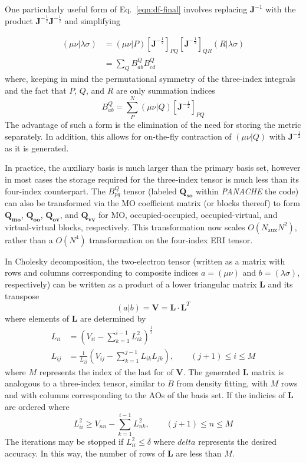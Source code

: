\documentclass[12pt,letterpaper]{article}
\newcommand{\transpose}{T}
\newcommand{\mat}[1]{\ensuremath{\bm{#1}}\xspace}
\newcommand{\ten}[1]{\ensuremath{\bm{#1}}\xspace}
\newcommand{\panache}{\textit{PANACHE}\xspace}
\newcommand{\Qso}{\ten{Q_{so}}}
\newcommand{\Qmo}{\ten{Q_{mo}}}
\newcommand{\Qoo}{\ten{Q_{oo}}}
\newcommand{\Qov}{\ten{Q_{ov}}}
\newcommand{\Qvv}{\ten{Q_{vv}}}
\begin{document}
One particularly useful form of Eq.~\ref{eqn:df-final}
involves replacing $\mat{J}^{-1}$ with the product
$\mat{J}^{-\frac{1}{2}}\mat{J}^{-\frac{1}{2}}$ and simplifying

\begin{align}
( \mu\nu | \lambda\sigma ) &= (\mu\nu | P) [\mat{J}^{-\frac{1}{2}}]_{PQ} [\mat{J}^{-\frac{1}{2}}]_{QR} (R | \lambda\sigma) \\
              &= \sum_{Q}  B_{ab}^Q B_{cd}^Q
\label{eqn:df-simple}
\end{align}
%
where, keeping in mind the permutational symmetry of the three-index integrals
and the fact that $P$, $Q$, and $R$ are only summation indices
% 
\begin{equation}
B_{ab}^Q = \sum_P^N ( \mu\nu | Q ) [\mat{J}^{-\frac{1}{2}}]_{PQ} 
\label{eqn:df-simpleB}
\end{equation}
%
The advantage of such a form is the elimination of the need for storing the
metric separately. In addition, this allows for on-the-fly contraction
of $( \mu\nu | Q )$ with $\mat{J}^{-\frac{1}{2}}$ as it is generated.

In practice, the auxiliary basis is much larger than the primary basis
set, however in most cases the storage required for the three-index tensor
is much less than its four-index counterpart.  The $B_{pq}^Q$ tensor
(labeled \Qso within \panache the code) can also be transformed via the
MO coefficient matrix (or blocks thereof) to form \Qmo, \Qoo, \Qov, and
\Qvv for MO, occupied-occupied, occupied-virtual, and virtual-virtual
blocks, respectively. This transformation now scales $O(N_\mathrm{aux} N^2)$, rather
than a $O(N^4)$ transformation on the four-index ERI tensor.


In Cholesky decomposition,\cite{Roeggen:2008a,Beebe:1977a} the two-electron tensor (written as a matrix
with rows and columns corresponding to composite indices $a=(\mu\nu)$
and $b=(\lambda\sigma)$, respectively) can be written as a product of a lower
triangular matrix $\mat{L}$ and its transpose
%
\begin{equation}
(a | b) = \mat{V} = \mat{L}\cdot\mat{L}^{\transpose}
\end{equation}
%
where elements of $\mat{L}$ are determined by
%
\begin{align}
L_{ii} &= \left( V_{ii} - \sum_{k=1}^{i-1} L_{ik}^2 \right)^{\frac{1}{2}} \\
L_{ij} &= \frac{1}{L_{jj}} \left( V_{ij} - \sum_{k=1}^{j-1} L_{ik}L_{jk} \right), \qquad (j+1) \leq i \leq M
\end{align}
%
where $M$ represents the index of the last for of $\mat{V}$.
The generated $\mat{L}$ matrix is analogous to a three-index tensor,
similar to $B$ from density fitting, with $M$ rows and with columns corresponding
to the AOs of the basis set.
If the indicies of $\mat{L}$ are ordered where
%
\begin{equation}
L_{ii}^2 \geq V_{nn} - \sum_{k=1}^{i-1} L_{nk}^2, \qquad (j+1) \leq n \leq M
\end{equation}
%
The iterations may be stopped if $L_{ii}^2 \leq \delta$ where $delta$ represents
the desired accuracy. In this way, the number of rows of $\mat{L}$ are less than
$M$.
\end{document}

